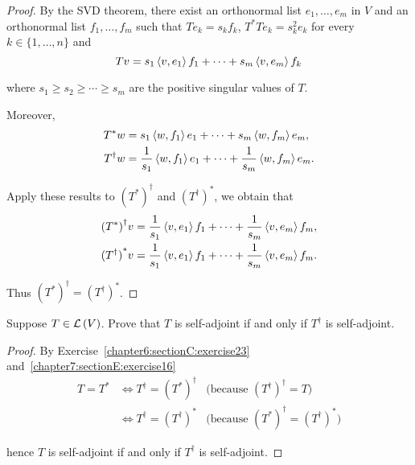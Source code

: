 \begin{proof}
    By the SVD theorem, there exist an orthonormal list $e_{1}, \ldots, e_{m}$ in $V$ and an orthonormal list $f_{1}, \ldots, f_{m}$ such that $Te_{k} = s_{k}f_{k}$, $T^{*}Te_{k} = s_{k}^{2}e_{k}$ for every $k\in\{1,\ldots,n\}$ and
    \[
        Tv = s_{1}\left\langle{v,e_{1}}\right\rangle f_{1} + \cdots + s_{m}\left\langle{v,e_{m}}\right\rangle f_{k}
    \]

    where $s_{1}\geq s_{2}\geq \cdots \geq s_{m}$ are the positive singular values of $T$.

    Moreover,
    \begin{align*}
        T^{*}w       & = s_{1}\left\langle{w,f_{1}}\right\rangle e_{1} + \cdots + s_{m}\left\langle{w, f_{m}}\right\rangle e_{m},                    \\
        T^{\dagger}w & = \frac{1}{s_{1}}\left\langle{w,f_{1}}\right\rangle e_{1} + \cdots + \frac{1}{s_{m}}\left\langle{w,f_{m}}\right\rangle e_{m}.
    \end{align*}

    Apply these results to ${(T^{*})}^{\dagger}$ and ${(T^{\dagger})}^{*}$, we obtain that
    \begin{align*}
        {(T^{*})}^{\dagger}v & = \frac{1}{s_{1}}\left\langle{v,e_{1}}\right\rangle f_{1} + \cdots + \frac{1}{s_{m}}\left\langle{v,e_{m}}\right\rangle f_{m}, \\
        {(T^{\dagger})}^{*}v & = \frac{1}{s_{1}}\left\langle{v,e_{1}}\right\rangle f_{1} + \cdots + \frac{1}{s_{m}}\left\langle{v,e_{m}}\right\rangle f_{m}.
    \end{align*}

    Thus ${(T^{*})}^{\dagger} = {(T^{\dagger})}^{*}$.
\end{proof}
\newpage

\begin{exercise}
    Suppose $T \in \mathcal{L}\left({V}\right)$. Prove that $T$ is self-adjoint if and only if $T^{\dagger}$ is self-adjoint.
\end{exercise}

\begin{proof}
    By Exercise~\ref{chapter6:sectionC:exercise23} and~\ref{chapter7:sectionE:exercise16}
    \begin{align*}
        T = T^{*} & \Longleftrightarrow T^{\dagger} = {(T^{*})}^{\dagger} & \text{(because ${(T^{\dagger})}^{\dagger} = T$)}             \\
                  & \Longleftrightarrow T^{\dagger} = {(T^{\dagger})}^{*} & \text{(because ${(T^{*})}^{\dagger} = {(T^{\dagger})}^{*}$)}
    \end{align*}

    hence $T$ is self-adjoint if and only if $T^{\dagger}$ is self-adjoint.
\end{proof}
\newpage

